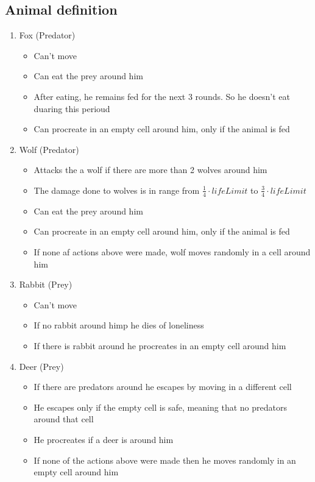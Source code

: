 \documentclass[11pt]{article}
\begin{document}
\subsection*{Animal definition}
\begin{enumerate}
\item
Fox (Predator)
	\begin{itemize}
	\item
		Can't move
	\item
		Can eat the prey around him
	\item
		After eating, he remains fed for the next 3 rounds. So he doesn't eat duaring this perioud
	\item
		Can procreate in an empty cell around him, only if the animal is fed
	\end{itemize}
\item
Wolf (Predator)
	\begin{itemize}
	\item
		Attacks the a wolf if there are more than 2 wolves around him
	\item
		The damage done to wolves is in range from $\frac{1}{4}\cdot lifeLimit$ to $\frac{3}{4}\cdot lifeLimit$
	\item
		Can eat the prey around him
	\item
		Can procreate in an empty cell around him, only if the animal is fed
	\item
		If none af actions above were made, wolf moves randomly in a cell around him
	\end{itemize}
\item
Rabbit (Prey)
	\begin{itemize}
	\item
		Can't move
	\item
		If no rabbit around himp he dies of loneliness
	\item
		If there is rabbit around he procreates in an empty cell around him
	\end{itemize}
\item
Deer (Prey)
	\begin{itemize}
	\item
		If there are predators around he escapes by moving in a different cell
	\item
		He escapes only if the empty cell is safe, meaning that no predators around that cell
	\item
		He procreates if a deer is around him
	\item
		If none of the actions above were made then he moves randomly in an empty cell around him
	\end{itemize}
\end{enumerate}
\end{document}
